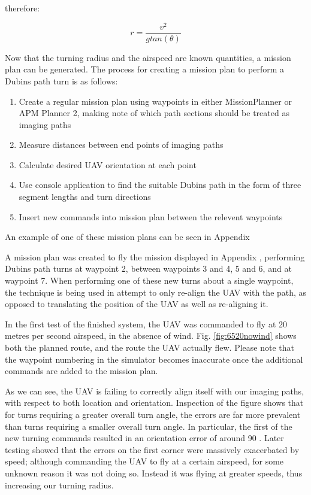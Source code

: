 therefore:

\begin{equation} \label{eq:turnradius}
	r = \frac{v^2}{gtan(\theta)}
\end{equation}

Now that the turning radius and the airspeed are known quantities, a mission plan can be generated. The process for creating a mission plan to perform a Dubins path turn is as follows:
\begin{enumerate}
	\item Create a regular mission plan using waypoints in either MissionPlanner or APM Planner 2, making note of which path sections should be treated as imaging paths
	\item Measure distances between end points of imaging paths
	\item Calculate desired UAV orientation at each point
	\item Use console application to find the suitable Dubins path in the form of three segment lengths and turn directions
	\item Insert new commands into mission plan between the relevent waypoints
\end{enumerate}

An example of one of these mission plans can be seen in Appendix %

A mission plan was created to fly the mission displayed in Appendix %
, performing Dubins path turns at waypoint 2, between waypoints 3 and 4, 5 and 6, and at waypoint 7. When performing one of these new turns about a single waypoint, the technique is being used in attempt to only re-align the UAV with the path, as opposed to translating the position of the UAV as well as re-aligning it. 

In the first test of the finished system, the UAV was commanded to fly at 20 metres per second airspeed, in the absence of wind. Fig. \ref{fig:6520nowind} shows both the planned route, and the route the UAV actually flew. Please note that the waypoint numbering in the simulator becomes inaccurate once the additional commands are added to the mission plan. 

As we can see, the UAV is failing to correctly align itself with our imaging paths, with respect to both location and orientation. Inspection of the figure shows that for turns requiring a greater overall turn angle, the errors are far more prevalent than turns requiring a smaller overall turn angle. In particular, the first of the new turning commands resulted in an orientation error of around 90 \degree. Later testing showed that the errors on the first corner were massively exacerbated by speed; although commanding the UAV to fly at a certain airspeed, for some unknown reason it was not doing so. Instead it was flying at greater speeds, thus increasing our turning radius.

